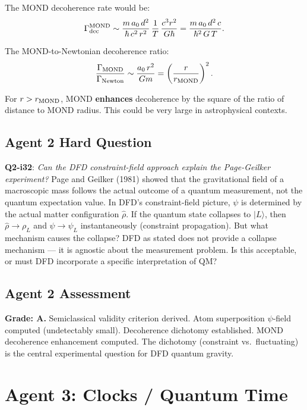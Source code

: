 \documentclass[11pt,a4paper]{article}
\begin{document}
The MOND decoherence rate would be:
\begin{equation}
\Gamma_{\rm dec}^{\rm MOND} \sim \frac{m\,a_0\,d^2}{\hbar\,c^2\,r^2}\,\frac{1}{T}\,\frac{c^3 r^2}{G\hbar}
= \frac{m\,a_0\,d^2\,c}{\hbar^2\,G\,T}.
\end{equation}

The MOND-to-Newtonian decoherence ratio:
\begin{equation}
\frac{\Gamma_{\rm MOND}}{\Gamma_{\rm Newton}} \sim \frac{a_0\,r^2}{Gm}
= \left(\frac{r}{r_{\rm MOND}}\right)^2.
\end{equation}

For $r > r_{\rm MOND}$, MOND \textbf{enhances} decoherence by the square of the ratio of distance to MOND radius. This could be very large in astrophysical contexts.

\subsection{Agent 2 Hard Question}

\textbf{Q2-i32}: \emph{Can the DFD constraint-field approach explain the Page-Geilker experiment?} Page and Geilker (1981) showed that the gravitational field of a macroscopic mass follows the actual outcome of a quantum measurement, not the quantum expectation value. In DFD's constraint-field picture, $\psi$ is determined by the actual matter configuration $\hat\rho$. If the quantum state collapses to $|L\rangle$, then $\hat\rho \to \rho_L$ and $\psi \to \psi_L$ instantaneously (constraint propagation). But what mechanism causes the collapse? DFD as stated does not provide a collapse mechanism --- it is agnostic about the measurement problem. Is this acceptable, or must DFD incorporate a specific interpretation of QM?

\subsection{Agent 2 Assessment}

\textbf{Grade: A.} Semiclassical validity criterion derived. Atom superposition $\psi$-field computed (undetectably small). Decoherence dichotomy established. MOND decoherence enhancement computed. The dichotomy (constraint vs.\ fluctuating) is the central experimental question for DFD quantum gravity.


\newpage
\section{Agent 3: Clocks / Quantum Time}
\label{sec:agent3}
\end{document}
